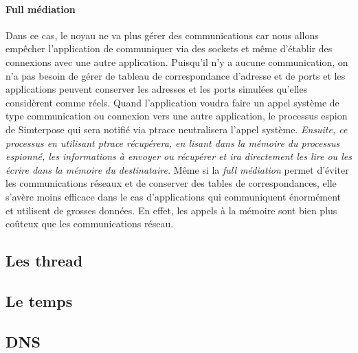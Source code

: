 \paragraph{Full médiation} 
Dans ce cas, le noyau ne va plus gérer des communications car nous allons
empêcher l'application de communiquer via des sockets et même d'établir des
connexions avec une autre application.  Puisqu'il n'y a aucune communication, on
n'a pas besoin de gérer de tableau de correspondance d'adresse et de ports et
les applications peuvent conserver les adresses et les ports simulées qu'elles
considèrent comme réels. Quand l'application voudra faire un appel système de
type communication ou connexion vers une autre application, le processus espion
de Simterpose qui sera notifié via ptrace neutralisera l'appel
système. \textit{Ensuite, ce processus en utilisant ptrace récupérera, en lisant
  dans la mémoire du processus espionné, les informations à envoyer ou récupérer
  et ira directement les lire ou les écrire dans la mémoire du destinataire.}
Même si la \textit{full médiation} permet d'éviter les communications réseaux et
de conserver des tables de correspondances, elle s'avère moins efficace
  dans le cas d'applications qui communiquent énormément et utilisent de grosses
  données. En effet, les appels à la mémoire sont bien plus coûteux que les
communications réseau.

\subsection{Les thread}

\subsection{Le temps}

\subsection{DNS}
